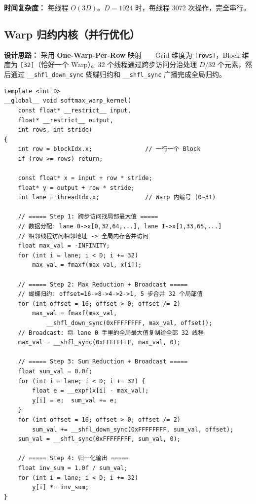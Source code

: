 \documentclass[12pt,a4paper]{ctexart}
\begin{document}
\textbf{时间复杂度：} 每线程 $O(3D)$。$D=1024$ 时，每线程 3072 次操作，完全串行。

\subsection{Warp 归约内核（并行优化）}

\textbf{设计思路：} 采用 \textbf{One-Warp-Per-Row} 映射——Grid 维度为 \texttt{[rows]}，Block 维度为 \texttt{[32]}（恰好一个 Warp）。32 个线程通过跨步访问分治处理 $D/32$ 个元素，然后通过 \texttt{\_\_shfl\_down\_sync} 蝴蝶归约和 \texttt{\_\_shfl\_sync} 广播完成全局归约。

\begin{lstlisting}[style=cuda, caption={Warp Shuffle Softmax 内核}, label=lst:warp]
template <int D>
__global__ void softmax_warp_kernel(
    const float* __restrict__ input,
    float* __restrict__ output,
    int rows, int stride)
{
    int row = blockIdx.x;               // 一行一个 Block
    if (row >= rows) return;

    const float* x = input + row * stride;
    float* y = output + row * stride;
    int lane = threadIdx.x;             // Warp 内编号 (0~31)

    // ===== Step 1: 跨步访问找局部最大值 =====
    // 数据分配: lane 0->x[0,32,64,...], lane 1->x[1,33,65,...]
    // 相邻线程访问相邻地址 -> 全局内存合并访问
    float max_val = -INFINITY;
    for (int i = lane; i < D; i += 32)
        max_val = fmaxf(max_val, x[i]);

    // ===== Step 2: Max Reduction + Broadcast =====
    // 蝴蝶归约: offset=16->8->4->2->1, 5 步合并 32 个局部值
    for (int offset = 16; offset > 0; offset /= 2)
        max_val = fmaxf(max_val,
            __shfl_down_sync(0xFFFFFFFF, max_val, offset));
    // Broadcast: 将 lane 0 手里的全局最大值复制给全部 32 线程
    max_val = __shfl_sync(0xFFFFFFFF, max_val, 0);

    // ===== Step 3: Sum Reduction + Broadcast =====
    float sum_val = 0.0f;
    for (int i = lane; i < D; i += 32) {
        float e = __expf(x[i] - max_val);
        y[i] = e;  sum_val += e;
    }
    for (int offset = 16; offset > 0; offset /= 2)
        sum_val += __shfl_down_sync(0xFFFFFFFF, sum_val, offset);
    sum_val = __shfl_sync(0xFFFFFFFF, sum_val, 0);

    // ===== Step 4: 归一化输出 =====
    float inv_sum = 1.0f / sum_val;
    for (int i = lane; i < D; i += 32)
        y[i] *= inv_sum;
}
\end{lstlisting}
\end{document}
